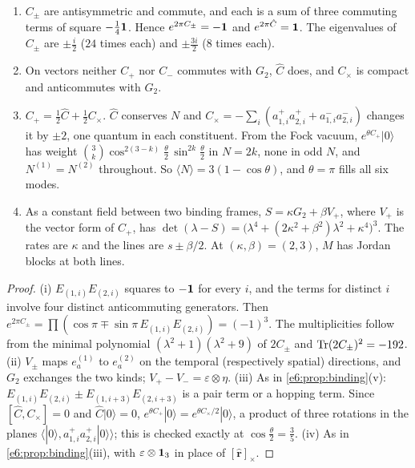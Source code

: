 \begin{proposition}
\label{e6:prop:copyrot}
\begin{enumerate}[label=(\roman*),leftmargin=2.2em]
\item $C_\pm$ are antisymmetric and commute, and each is a sum of three commuting terms of square $-\tfrac14\mathbf 1$. Hence $e^{2\pi C_\pm}=-\mathbf 1$ and $e^{2\pi \hat C}=\mathbf 1$.
The eigenvalues of $C_\pm$ are $\pm\tfrac i2$ ($24$ times each) and $\pm\tfrac{3i}2$ ($8$ times each).
\item On vectors neither $C_+$ nor $C_-$ commutes with $G_2$, $\hat C$ does, and $C_\times$ is compact and anticommutes with $G_2$.
\item $C_+=\tfrac12\hat C+\tfrac12C_\times$. $\hat C$ conserves $N$ and $C_\times=-\sum_i(a^+_{1,i}a^+_{2,i}+a^-_{1,i}a^-_{2,i})$ changes it by $\pm2$, one quantum in each
constituent. From the Fock vacuum, $e^{\theta C_+}|0\rangle$ has weight $\binom3k\cos^{2(3-k)}\tfrac\theta2\,\sin^{2k}\tfrac\theta2$ in $N=2k$, none in odd $N$,
and $N^{(1)}=N^{(2)}$ throughout. So $\langle N\rangle=3(1-\cos\theta)$, and $\theta=\pi$ fills all six modes.
\item As a constant field between two binding frames, $S=\kappa G_2+\beta V_+$, where $V_+$ is the vector form of $C_+$, has
$\det(\lambda-S)=\bigl(\lambda^4+(2\kappa^2+\beta^2)\lambda^2+\kappa^4\bigr)^3$. The rates are $\kappa$ and the lines are $s\pm\beta/2$. At $(\kappa,\beta)=(2,3)$, $M$ has Jordan blocks
at both lines.
\end{enumerate}
\end{proposition}

\begin{proof}
(i) $E_{(1,i)}E_{(2,i)}$ squares to $-\mathbf 1$ for every $i$, and the terms for distinct $i$ involve four distinct anticommuting generators. Then
$e^{2\pi C_\pm}=\prod(\cos\pi\mp\sin\pi\,E_{(1,i)}E_{(2,i)})=(-1)^3$. The multiplicities follow from the minimal polynomial $(\lambda^2+1)(\lambda^2+9)$ of
$2C_\pm$ and $\operatorname{Tr}(2C_\pm)^2=-192$. (ii) $V_\pm$ maps $e^{(1)}_a$ to $e^{(2)}_a$ on the temporal (respectively spatial) directions, and $G_2$ exchanges the two
kinds; $V_+-V_-=\varepsilon\otimes\eta$. (iii) As in \cref{e6:prop:binding}(v): $E_{(1,i)}E_{(2,i)}\pm E_{(1,i+3)}E_{(2,i+3)}$ is a pair term or a hopping term. Since
$[\hat C,C_\times]=0$ and $\hat C|0\rangle=0$, $e^{\theta C_+}|0\rangle=e^{\theta C_\times/2}|0\rangle$, a product of three rotations in the planes
$\langle|0\rangle,a^+_{1,i}a^+_{2,i}|0\rangle\rangle$; this is checked exactly at $\cos\tfrac\theta2=\tfrac35$. (iv) As in \cref{e6:prop:binding}(iii), with
$\varepsilon\otimes\mathbf 1_3$ in place of $[\hat{\mathbf r}]_\times$.
\end{proof}


